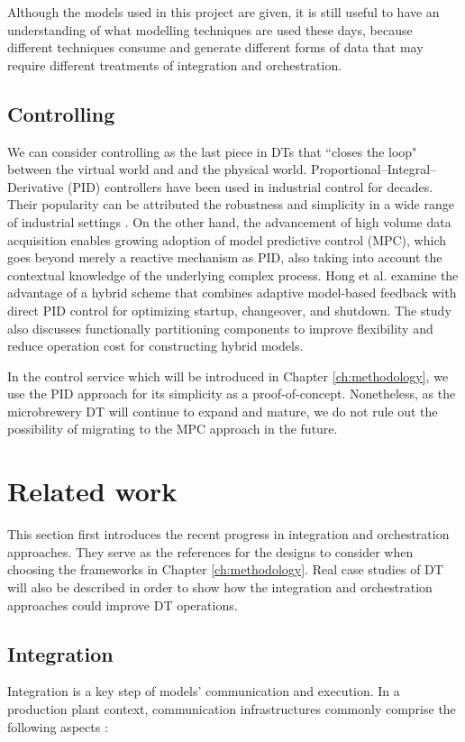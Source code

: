 Although the models used in this project are given, it is still useful to have an understanding of what modelling techniques are used these days, because different techniques consume and generate different forms of data that may require different treatments of integration and orchestration.

\subsection{Controlling}
We can consider controlling as the last piece in DTs that ``closes the loop" between the virtual world and and the physical world. Proportional–Integral–Derivative (PID) controllers have been used  in industrial control for decades. Their popularity can be attributed the robustness and simplicity in a wide range of industrial settings \cite{pidni}. On the other hand, the advancement of high volume data acquisition enables growing adoption of model predictive control (MPC), which goes beyond merely a reactive mechanism as PID, also taking into account the contextual knowledge of the underlying complex process. Hong et al. \cite{Hong2018} examine the advantage of a hybrid scheme that combines adaptive model-based feedback with direct PID control for optimizing startup, changeover, and shutdown. The study also discusses functionally partitioning components to improve flexibility and reduce operation cost for constructing hybrid models.  

In the control service which will be introduced in Chapter \ref{ch:methodology}, we use the PID approach for its simplicity as a proof-of-concept. Nonetheless, as the microbrewery DT will continue to expand and mature, we do not rule out the possibility of migrating to the MPC approach in the future. 

\section{Related work}\label{sec:relatedwork}
This section first introduces the recent progress in integration and orchestration approaches. They serve as the references for the designs to consider when choosing the frameworks in Chapter \ref{ch:methodology}. Real case studies of DT will also be described in order to show how the integration and orchestration approaches could improve DT operations.

\subsection{Integration} \label{sec:inte}
Integration is a key step of models' communication and execution. In a production plant context, communication infrastructures commonly comprise the following aspects \cite{Gargalo2020}:


